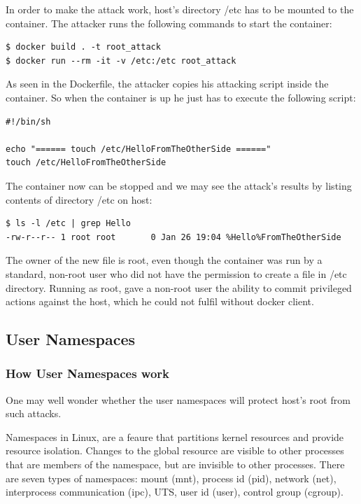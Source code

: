In order to make the attack work, host's directory /etc has to be mounted to the container. The attacker runs the following commands to start the container:

\begin{lstlisting}[style=terminal]
$ docker build . -t root_attack
$ docker run --rm -it -v /etc:/etc root_attack
\end{lstlisting}

As seen in the Dockerfile, the attacker copies his attacking script inside the container. So when the container is up he just has to execute the following script:

\begin{lstlisting}[style=shellscript, caption={3\_attack.sh}]
#!/bin/sh

echo "====== touch /etc/HelloFromTheOtherSide ======"
touch /etc/HelloFromTheOtherSide
\end{lstlisting}

The container now can be stopped and we may see the attack's results by listing contents of directory /etc on host:

\begin{lstlisting}[style=terminal]
$ ls -l /etc | grep Hello
-rw-r--r-- 1 root root       0 Jan 26 19:04 %Hello%FromTheOtherSide
\end{lstlisting}

The owner of the new file is root, even though the container was run by a standard, non-root user who did not have the permission to create a file in /etc directory.
Running as root, gave a non-root user the ability to commit privileged actions against the host, which he could not fulfil without docker client. 

\subsection{User Namespaces}
\subsubsection{How User Namespaces work}
One may well wonder whether the user namespaces will protect host's root from such attacks.

Namespaces in Linux, are a feaure that partitions kernel resources and provide resource isolation. Changes to the global resource are visible to other processes that are members of the namespace, but are invisible to other processes. There are seven types of namespaces: mount (mnt), process id (pid), network (net), interprocess communication (ipc), UTS, user id (user), control group (cgroup).

